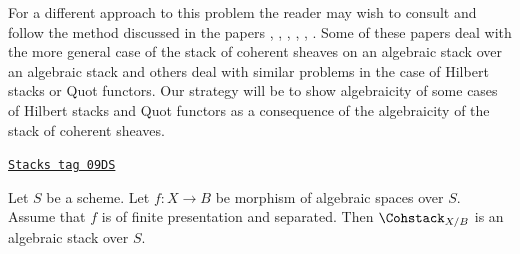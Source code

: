 \medskip\noindent
For a different approach to this problem the reader may wish to consult
\cite{ArtinI} and follow the method discussed in the papers
\cite{olsson-starr}, \cite{lieblich_remarks}, \cite{olsson_proper},
\cite{Hall-Rydh}, \cite{Hall-Rydh-Hilbert}, \cite{rydh_representability}.
Some of these papers deal with the more general case of the stack of
coherent sheaves on an algebraic stack over an algebraic stack and
others deal with similar problems in the case of Hilbert stacks
or Quot functors. Our strategy will be to show algebraicity of some
cases of Hilbert stacks and Quot functors as a consequence of the
algebraicity of the stack of coherent sheaves.

\begin{theorem}

\label{quot-theorem-coherent-algebraic-general}
\href{https://stacks.math.columbia.edu/tag/09DS}{\texttt{Stacks tag 09DS}}

Let $S$ be a scheme. Let $f : X \to B$ be morphism of algebraic spaces
over $S$. Assume that $f$ is of finite presentation and separated. Then
$\Cohstack_{X/B}$ is an algebraic stack over $S$.
\end{theorem}

